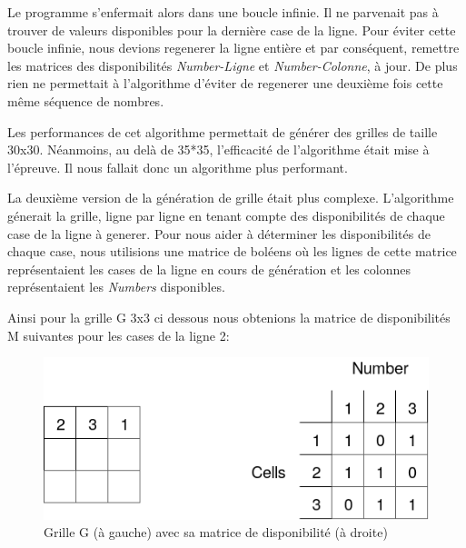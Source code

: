 \documentclass[1]{report}
\begin{document}
        Le programme s'enfermait alors dans une boucle infinie. Il ne parvenait pas à trouver de valeurs disponibles pour la dernière case de la ligne. Pour éviter cette boucle infinie, nous devions regenerer la ligne entière et par conséquent, remettre les matrices des disponibilités \textit{Number-Ligne} et \textit{Number-Colonne}, à jour. De plus rien ne permettait à l'algorithme d'éviter de regenerer une deuxième fois cette même séquence de nombres. \newline 
        
        Les performances de cet algorithme permettait de générer des grilles de taille 30x30. Néanmoins, au delà de 35*35, l'efficacité de l'algorithme était mise à l'épreuve. Il nous fallait donc un algorithme plus performant. \newline
        
        La deuxième version de la génération de grille était plus complexe. L'algorithme génerait la grille, ligne par ligne en tenant compte des disponibilités de chaque case de la ligne à generer. Pour nous aider à déterminer les disponibilités de chaque case, nous utilisions une matrice de boléens où les lignes de cette matrice représentaient les cases de la ligne en cours de génération et les colonnes représentaient les \textit{Numbers} disponibles. \newline
        
        Ainsi pour la grille G 3x3 ci dessous nous obtenions la matrice de disponibilités M suivantes pour les cases de la ligne 2: \newline
        
        \newpage
        
        \begin{figure}[h]
            \centering
                \includegraphics[scale=0.4]{disponibility1.PNG}
                \caption{Grille G (à gauche) avec sa matrice de disponibilité (à droite)}
        \end{figure}
     
\end{document}
